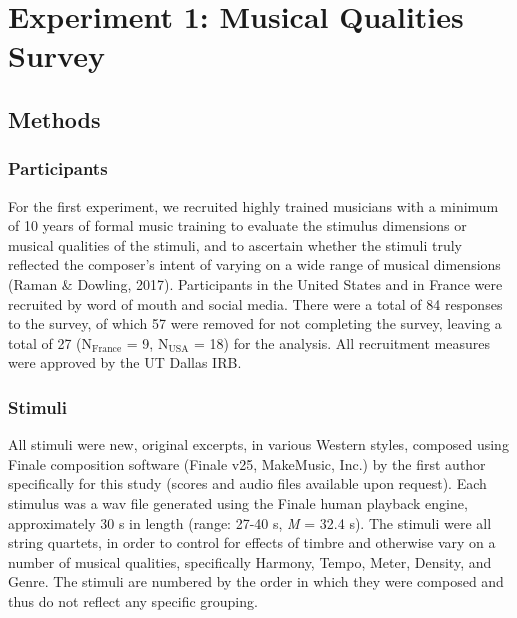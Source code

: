 \documentclass[
  english,
  man,floatsintext]{apa6}
\begin{document}
\hypertarget{experiment-1-musical-qualities-survey}{%
\section{Experiment 1: Musical Qualities Survey}\label{experiment-1-musical-qualities-survey}}

\hypertarget{methods}{%
\subsection{Methods}\label{methods}}

\hypertarget{participants}{%
\subsubsection{Participants}\label{participants}}

For the first experiment, we recruited highly trained musicians with a minimum of 10 years of formal music training to evaluate the stimulus dimensions or musical qualities of the stimuli, and to ascertain whether the stimuli truly reflected the composer's intent of varying on a wide range of musical dimensions (Raman \& Dowling, 2017). Participants in the United States and in France were recruited by word of mouth and social media. There were a total of 84 responses to the survey, of which 57 were removed for not completing the survey, leaving a total of 27 (N\(\mathrm{_{France}}\) = 9, N\(\mathrm{_{USA}}\) = 18) for the analysis. All recruitment measures were approved by the UT Dallas IRB.

\hypertarget{stimuli}{%
\subsubsection{Stimuli}\label{stimuli}}

All stimuli were new, original excerpts, in various Western styles, composed using Finale composition software (Finale v25, MakeMusic, Inc.) by the first author specifically for this study (scores and audio files available upon request). Each stimulus was a wav file generated using the Finale human playback engine, approximately 30 s in length (range: 27-40 s, \emph{M} = 32.4 s). The stimuli were all string quartets, in order to control for effects of timbre and otherwise vary on a number of musical qualities, specifically Harmony, Tempo, Meter, Density, and Genre. The stimuli are numbered by the order in which they were composed and thus do not reflect any specific grouping.
\end{document}
